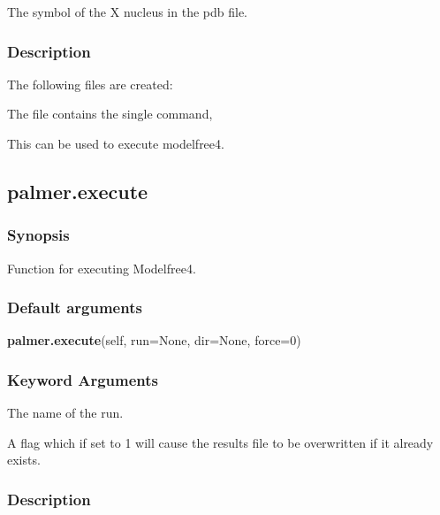   The symbol of the X nucleus in the pdb file.


\subsubsection{Description}

The following files are created:
    

    

    

    

    


The file 
 contains the single command,
    

This can be used to execute modelfree4.


\newpage

\subsection{palmer.execute}


\subsubsection{Synopsis}

Function for executing Modelfree4.

\subsubsection{Default arguments}

\textsf{\textbf{palmer.execute}(self, run=None, dir=None, force=0)}


\subsubsection{Keyword Arguments}

  The name of the run.

  A flag which if set to 1 will cause the results file to be overwritten if it already exists.

\subsubsection{Description}

